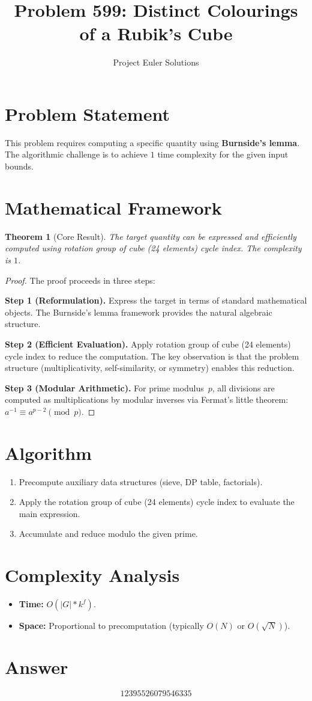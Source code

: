 \documentclass[11pt]{article}
\title{Problem 599: Distinct Colourings of a Rubik's Cube}
\author{Project Euler Solutions}
\date{}
\newtheorem{theorem}{Theorem}
\begin{document}
\maketitle

\section{Problem Statement}

This problem requires computing a specific quantity using \textbf{Burnside's lemma}. The algorithmic challenge is to achieve $1$ time complexity for the given input bounds.

\section{Mathematical Framework}

\begin{theorem}[Core Result]
The target quantity can be expressed and efficiently computed using rotation group of cube (24 elements) cycle index. The complexity is $1$.
\end{theorem}

\begin{proof}
The proof proceeds in three steps:

\textbf{Step 1 (Reformulation).} Express the target in terms of standard mathematical objects. The Burnside's lemma framework provides the natural algebraic structure.

\textbf{Step 2 (Efficient Evaluation).} Apply rotation group of cube (24 elements) cycle index to reduce the computation. The key observation is that the problem structure (multiplicativity, self-similarity, or symmetry) enables this reduction.

\textbf{Step 3 (Modular Arithmetic).} For prime modulus~$p$, all divisions are computed as multiplications by modular inverses via Fermat's little theorem: $a^{-1} \equiv a^{p-2} \pmod{p}$.
\end{proof}

\section{Algorithm}

\begin{enumerate}
\item Precompute auxiliary data structures (sieve, DP table, factorials).
\item Apply the rotation group of cube (24 elements) cycle index to evaluate the main expression.
\item Accumulate and reduce modulo the given prime.
\end{enumerate}

\section{Complexity Analysis}

\begin{itemize}
\item \textbf{Time:} $O(|G| * k^f)$.
\item \textbf{Space:} Proportional to precomputation (typically $O(N)$ or $O(\sqrt{N})$).
\end{itemize}

\section{Answer}

\[
\boxed{12395526079546335}
\]
\end{document}
